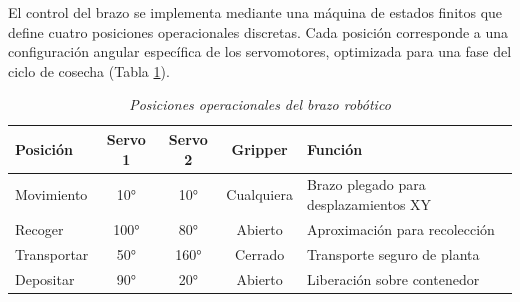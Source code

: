El control del brazo se implementa mediante una máquina de estados finitos que define cuatro posiciones operacionales discretas. Cada posición corresponde a una configuración angular específica de los servomotores, optimizada para una fase del ciclo de cosecha (Tabla \ref{tab:estados_brazo}).

\begin{table}[H]
\centering
\small
\begin{tabular}{|l|c|c|c|p{4.5cm}|}
\hline
\textbf{Posición} & \textbf{Servo 1} & \textbf{Servo 2} & \textbf{Gripper} & \textbf{Función} \\
\hline
Movimiento & 10° & 10° & Cualquiera & Brazo plegado para desplazamientos XY \\
\hline
Recoger & 100° & 80° & Abierto & Aproximación para recolección \\
\hline
Transportar & 50° & 160° & Cerrado & Transporte seguro de planta \\
\hline
Depositar & 90° & 20° & Abierto & Liberación sobre contenedor \\
\hline
\end{tabular}
\caption{\textit{Posiciones operacionales del brazo robótico}}
\label{tab:estados_brazo}
\end{table}

